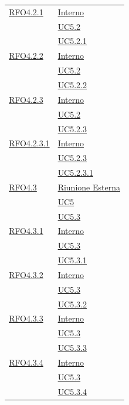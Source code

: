 \begin{longtable}{|>{\centering}m{5cm}|m{5cm}<{\centering}|}
\hyperlink{RFO4.2.1}{RFO4.2.1} & \hyperlink{Interno}{Interno}\\
& \hyperref[UC5.2]{UC5.2}\\
& \hyperref[UC5.2.1]{UC5.2.1}\\ \hline

\hyperlink{RFO4.2.2}{RFO4.2.2} & \hyperlink{Interno}{Interno}\\
& \hyperref[UC5.2]{UC5.2}\\
& \hyperref[UC5.2.2]{UC5.2.2}\\ \hline

\hyperlink{RFO4.2.3}{RFO4.2.3} & \hyperlink{Interno}{Interno}\\
& \hyperref[UC5.2]{UC5.2}\\
& \hyperref[UC5.2.3]{UC5.2.3}\\ \hline

\hyperlink{RFO4.2.3.1}{RFO4.2.3.1} & \hyperlink{Interno}{Interno}\\
& \hyperref[UC5.2.3]{UC5.2.3}\\
& \hyperref[UC5.2.3.1]{UC5.2.3.1}\\ \hline

\hyperlink{RFO4.3}{RFO4.3} & \hyperlink{Riunione Esterna}{Riunione Esterna}\\
& \hyperref[UC5]{UC5}\\
& \hyperref[UC5.3]{UC5.3}\\ \hline

\hyperlink{RFO4.3.1}{RFO4.3.1} & \hyperlink{Interno}{Interno}\\
& \hyperref[UC5.3]{UC5.3}\\
& \hyperref[UC5.3.1]{UC5.3.1}\\ \hline

\hyperlink{RFO4.3.2}{RFO4.3.2} & \hyperlink{Interno}{Interno}\\
& \hyperref[UC5.3]{UC5.3}\\
& \hyperref[UC5.3.2]{UC5.3.2}\\ \hline

\hyperlink{RFO4.3.3}{RFO4.3.3} & \hyperlink{Interno}{Interno}\\
& \hyperref[UC5.3]{UC5.3}\\
& \hyperref[UC5.3.3]{UC5.3.3}\\ \hline

\hyperlink{RFO4.3.4}{RFO4.3.4} & \hyperlink{Interno}{Interno}\\
& \hyperref[UC5.3]{UC5.3}\\
& \hyperref[UC5.3.4]{UC5.3.4}\\ \hline


\end{longtable}

